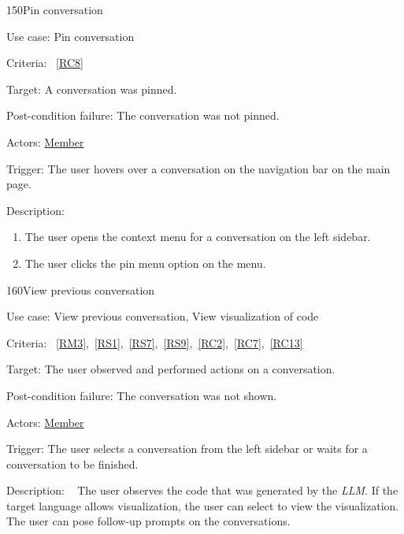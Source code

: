 \vspace{2.0em}

\begin{function}{150}{Pin conversation}
	\item[Use case:] Pin conversation
	\item[Criteria:]~\ref{RC8}
	\item[Target:] A conversation was pinned.
	\item[Post-condition failure:] The conversation was not pinned.
	\item[Actors:] \hyperref[def:member]{Member}
	\item[Trigger:] The user hovers over a conversation on the navigation bar on the main page.
	\item[Description:] ~
	\begin{enumerate}
	    \item The user opens the context menu for a conversation on the left sidebar.
		\item The user clicks the pin menu option on the menu.
	\end{enumerate}
\end{function}

\vspace{2.0em}

\begin{function}{160}{View previous conversation}
	\item[Use case:] View previous conversation, View visualization of code
	\item[Criteria:]~\ref{RM3},~\ref{RS1},~\ref{RS7},~\ref{RS9},~\ref{RC2},~\ref{RC7},~\ref{RC13}
	\item[Target:] The user observed and performed actions on a conversation.
	\item[Post-condition failure:] The conversation was not shown.
	\item[Actors:] \hyperref[def:member]{Member}
	\item[Trigger:] The user selects a conversation from the left sidebar or waits for a conversation to be finished.
	\item[Description:] ~
	The user observes the code that was generated by the \textit{LLM}. \newline
	If the target language allows visualization, the user can select to view the visualization.
	The user can pose follow-up prompts on the conversations.
\end{function}

\vspace{2.0em}

